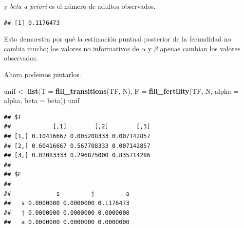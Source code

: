 \documentclass[
]{book}
\newenvironment{Shaded}{\begin{snugshade}}{\end{snugshade}}
\newcommand{\AttributeTok}[1]{\textcolor[rgb]{0.13,0.29,0.53}{#1}}
\newcommand{\CommentTok}[1]{\textcolor[rgb]{0.56,0.35,0.01}{\textit{#1}}}
\newcommand{\DecValTok}[1]{\textcolor[rgb]{0.00,0.00,0.81}{#1}}
\newcommand{\FloatTok}[1]{\textcolor[rgb]{0.00,0.00,0.81}{#1}}
\newcommand{\FunctionTok}[1]{\textcolor[rgb]{0.13,0.29,0.53}{\textbf{#1}}}
\newcommand{\NormalTok}[1]{#1}
\newcommand{\OtherTok}[1]{\textcolor[rgb]{0.56,0.35,0.01}{#1}}
\newcommand{\SpecialCharTok}[1]{\textcolor[rgb]{0.81,0.36,0.00}{\textbf{#1}}}
\theoremstyle{definition}
\theoremstyle{definition}
\theoremstyle{definition}
\theoremstyle{definition}
\theoremstyle{remark}
\begin{document}
y \emph{beta a priori} es el número de adultos observados.

\begin{Shaded}
\end{Shaded}

\begin{verbatim}
## [1] 0.1176473
\end{verbatim}

Esto demuestra por qué la estimación puntual posterior de la fecundidad
no cambia mucho; los valores no informativos de \(\alpha\) y \(\beta\)
apenas cambian los valores observados.

Ahora podemos juntarlos.

\begin{Shaded}
\begin{Highlighting}[]
\NormalTok{unif }\OtherTok{\textless{}{-}} \FunctionTok{list}\NormalTok{(}\AttributeTok{T =} \FunctionTok{fill\_transitions}\NormalTok{(TF, N), }
             \AttributeTok{F =} \FunctionTok{fill\_fertility}\NormalTok{(TF, N, }
                                \AttributeTok{alpha =}\NormalTok{ alpha,}
                                \AttributeTok{beta =}\NormalTok{ beta))}
\NormalTok{unif}
\end{Highlighting}
\end{Shaded}

\begin{verbatim}
## $T
##            [,1]        [,2]        [,3]
## [1,] 0.10416667 0.005208333 0.007142857
## [2,] 0.60416667 0.567708333 0.007142857
## [3,] 0.02083333 0.296875000 0.835714286
## 
## $F
##    
##             s         j         a
##   s 0.0000000 0.0000000 0.1176473
##   j 0.0000000 0.0000000 0.0000000
##   a 0.0000000 0.0000000 0.0000000
\end{verbatim}
\end{document}
